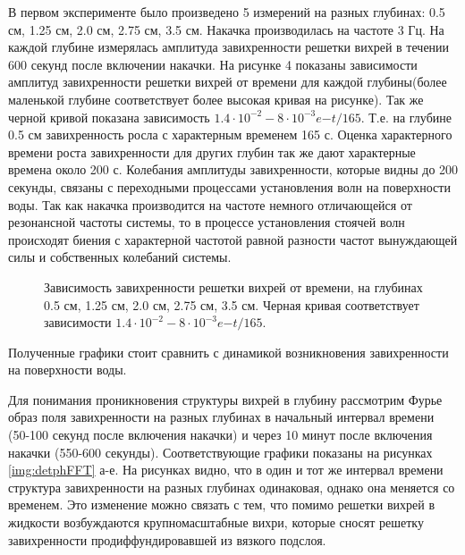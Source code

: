 В первом эксперименте было произведено 5 измерений на разных глубинах: 0.5 см, 1.25 см, 2.0 см, 2.75 см, 3.5 см. Накачка производилась на частоте 3 Гц. На каждой глубине измерялась амплитуда завихренности решетки вихрей в течении 600 секунд после включении накачки. На рисунке 4 показаны зависимости амплитуд завихренности решетки вихрей от времени для каждой глубины(более маленькой глубине соответствует более высокая кривая на рисунке). Так же черной кривой показана зависимость $1.4 \cdot 10^{-2} - 8 \cdot 10^{-3} e{-t/165}$. Т.е. на глубине 0.5 см завихренность росла с характерным временем 165 с. Оценка характерного времени роста завихренности для других глубин так же дают характерные времена около 200 с. Колебания амплитуды завихренности, которые видны до 200 секунды, связаны с переходными процессами установления волн на поверхности воды. Так как накачка производится на частоте немного отличающейся от резонансной частоты системы, то в процессе установления стоячей волн происходят биения с характерной частотой равной разности частот вынуждающей силы и собственных колебаний системы.

\begin{figure}[ht]
  \caption{Зависимость завихренности решетки вихрей от времени, на глубинах 0.5 см, 1.25 см, 2.0 см, 2.75 см, 3.5 см. Черная кривая соответствует зависимости $1.4 \cdot 10^{-2} - 8 \cdot 10^{-3} e{-t/165}$.}
  \label{img:5deeps}  
\end{figure}

Полученные графики стоит сравнить с динамикой возникновения завихренности на поверхности воды. 

Для понимания проникновения структуры вихрей в глубину рассмотрим Фурье образ поля завихренности на разных глубинах в начальный интервал времени (50-100 секунд после включения накачки) и через 10 минут после включения накачки (550-600 секунды). Соответствующие графики показаны на рисунках \ref{img:detphFFT} а-е. На рисунках видно, что в один и тот же интервал времени структура завихренности на разных глубинах одинаковая, однако она меняется со временем. Это изменение можно связать с тем, что помимо решетки вихрей в жидкости возбуждаются крупномасштабные вихри, которые сносят  решетку завихренности продиффундировавшей из вязкого подслоя.

